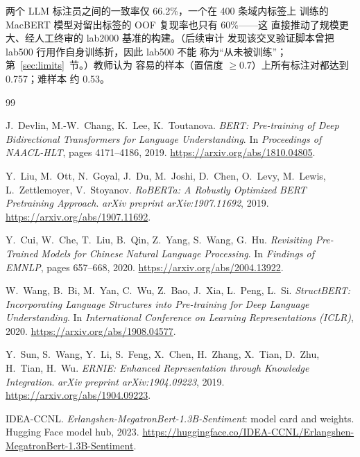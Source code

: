 \documentclass[11pt,a4paper]{article}
\begin{document}
两个 LLM 标注员之间的一致率仅 66.2\%，一个在 400 条域内标签上
训练的 MacBERT 模型对留出标签的 OOF 复现率也只有 60\%——这
直接推动了规模更大、经人工终审的 lab2000 基准的构建。（后续审计
发现该交叉验证脚本曾把 lab500 行用作自身训练折，因此 lab500 不能
称为“从未被训练”；第~\ref{sec:limits}~节。）教师认为
容易的样本（置信度 $\ge 0.7$）上所有标注对都达到 0.757；难样本
约 0.53。

\begin{thebibliography}{99}\small

J.~Devlin, M.-W.~Chang, K.~Lee, K.~Toutanova.
\newblock \emph{BERT: Pre-training of Deep Bidirectional Transformers for Language Understanding}.
\newblock In \emph{Proceedings of NAACL-HLT}, pages 4171--4186, 2019.
\newblock \url{https://arxiv.org/abs/1810.04805}.

Y.~Liu, M.~Ott, N.~Goyal, J.~Du, M.~Joshi, D.~Chen, O.~Levy, M.~Lewis,
L.~Zettlemoyer, V.~Stoyanov.
\newblock \emph{RoBERTa: A Robustly Optimized BERT Pretraining Approach}.
\newblock \emph{arXiv preprint arXiv:1907.11692}, 2019.
\newblock \url{https://arxiv.org/abs/1907.11692}.

Y.~Cui, W.~Che, T.~Liu, B.~Qin, Z.~Yang, S.~Wang, G.~Hu.
\newblock \emph{Revisiting Pre-Trained Models for Chinese Natural Language Processing}.
\newblock In \emph{Findings of EMNLP}, pages 657--668, 2020.
\newblock \url{https://arxiv.org/abs/2004.13922}.

W.~Wang, B.~Bi, M.~Yan, C.~Wu, Z.~Bao, J.~Xia, L.~Peng, L.~Si.
\newblock \emph{StructBERT: Incorporating Language Structures into Pre-training for Deep Language Understanding}.
\newblock In \emph{International Conference on Learning Representations (ICLR)}, 2020.
\newblock \url{https://arxiv.org/abs/1908.04577}.

Y.~Sun, S.~Wang, Y.~Li, S.~Feng, X.~Chen, H.~Zhang, X.~Tian, D.~Zhu,
H.~Tian, H.~Wu.
\newblock \emph{ERNIE: Enhanced Representation through Knowledge Integration}.
\newblock \emph{arXiv preprint arXiv:1904.09223}, 2019.
\newblock \url{https://arxiv.org/abs/1904.09223}.

IDEA-CCNL.
\newblock \emph{Erlangshen-MegatronBert-1.3B-Sentiment}: model card and weights.
\newblock Hugging Face model hub, 2023.
\newblock \url{https://huggingface.co/IDEA-CCNL/Erlangshen-MegatronBert-1.3B-Sentiment}.


\end{thebibliography}
\end{document}
